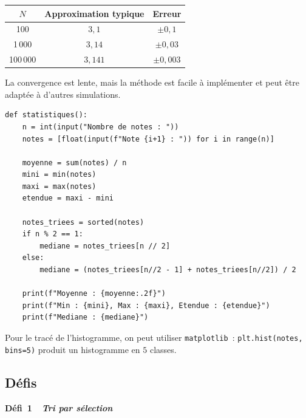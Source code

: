 \begin{center}
\renewcommand{\arraystretch}{1.2}
\begin{tabular}{ccc}
\toprule
$N$ & Approximation typique & Erreur \\
\midrule
100 & $3{,}1$ & $\pm0{,}1$ \\
1\,000 & $3{,}14$ & $\pm0{,}03$ \\
100\,000 & $3{,}141$ & $\pm0{,}003$ \\
\bottomrule
\end{tabular}
\end{center}

La convergence est lente, mais la méthode est facile à implémenter et peut être
adaptée à d'autres simulations.


\begin{lstlisting}[style=python]
def statistiques():
    n = int(input("Nombre de notes : "))
    notes = [float(input(f"Note {i+1} : ")) for i in range(n)]
    
    moyenne = sum(notes) / n
    mini = min(notes)
    maxi = max(notes)
    etendue = maxi - mini
    
    notes_triees = sorted(notes)
    if n % 2 == 1:
        mediane = notes_triees[n // 2]
    else:
        mediane = (notes_triees[n//2 - 1] + notes_triees[n//2]) / 2
    
    print(f"Moyenne : {moyenne:.2f}")
    print(f"Min : {mini}, Max : {maxi}, Etendue : {etendue}")
    print(f"Mediane : {mediane}")
\end{lstlisting}

Pour le tracé de l'histogramme, on peut utiliser \texttt{matplotlib}~:
\texttt{plt.hist(notes, bins=5)} produit un histogramme en $5$ classes.

\subsection*{D\'efis}

\noindent{}
{\color{BO}\bfseries\small D\'efi~1~\textendash\ \textit{Tri par s\'election}}
\par\smallskip

\begin{algorithm}[H]
\caption{Tri par s\'election}
\end{algorithm}

